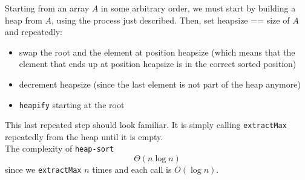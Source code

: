 \noindent Starting from an array $A$ in some arbitrary order, we must start by building a heap from $A$, using the process just described. Then, set heapsize == size of $A$ and repeatedly:
\begin{itemize}
	\item swap the root and the element at position heapsize (which means that the element that ends up at position heapsize is in the correct sorted position)
	\item decrement heapsize (since the last element is not part of the heap anymore)
	\item \texttt{heapify} starting at the root
\end{itemize} 
This last repeated step should look familiar. It is simply calling \texttt{extractMax} repeatedly from the heap until it is empty.\\

\noindent The complexity of \texttt{heap-sort}
$$\Theta(n \log n)$$
since we \texttt{extractMax} $n$ times and each call is $O(\log n)$.
